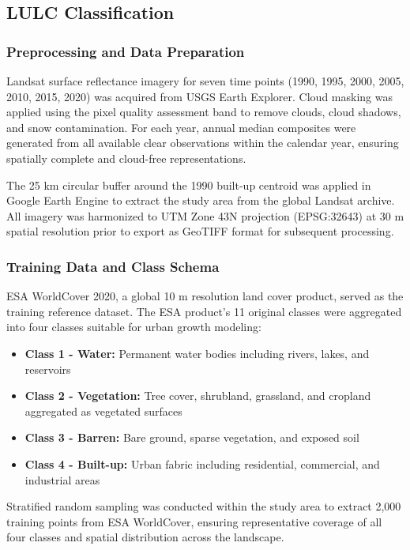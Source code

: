 \documentclass[conference]{IEEEtran}
\begin{document}
\subsection{LULC Classification}

\subsubsection{Preprocessing and Data Preparation}
Landsat surface reflectance imagery for seven time points (1990, 1995, 2000, 2005, 2010, 2015, 2020) was acquired from USGS Earth Explorer. Cloud masking was applied using the pixel quality assessment band to remove clouds, cloud shadows, and snow contamination. For each year, annual median composites were generated from all available clear observations within the calendar year, ensuring spatially complete and cloud-free representations.

The 25 km circular buffer around the 1990 built-up centroid was applied in Google Earth Engine to extract the study area from the global Landsat archive. All imagery was harmonized to UTM Zone 43N projection (EPSG:32643) at 30 m spatial resolution prior to export as GeoTIFF format for subsequent processing.

\subsubsection{Training Data and Class Schema}
ESA WorldCover 2020, a global 10 m resolution land cover product, served as the training reference dataset. The ESA product's 11 original classes were aggregated into four classes suitable for urban growth modeling:

\begin{itemize}
\item \textbf{Class 1 - Water:} Permanent water bodies including rivers, lakes, and reservoirs
\item \textbf{Class 2 - Vegetation:} Tree cover, shrubland, grassland, and cropland aggregated as vegetated surfaces
\item \textbf{Class 3 - Barren:} Bare ground, sparse vegetation, and exposed soil
\item \textbf{Class 4 - Built-up:} Urban fabric including residential, commercial, and industrial areas
\end{itemize}

Stratified random sampling was conducted within the study area to extract 2,000 training points from ESA WorldCover, ensuring representative coverage of all four classes and spatial distribution across the landscape.
\end{document}
